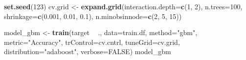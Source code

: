 \documentclass[]{article}
\newenvironment{Shaded}{\begin{snugshade}}{\end{snugshade}}
\newcommand{\DataTypeTok}[1]{\textcolor[rgb]{0.13,0.29,0.53}{#1}}
\newcommand{\DecValTok}[1]{\textcolor[rgb]{0.00,0.00,0.81}{#1}}
\newcommand{\FloatTok}[1]{\textcolor[rgb]{0.00,0.00,0.81}{#1}}
\newcommand{\KeywordTok}[1]{\textcolor[rgb]{0.13,0.29,0.53}{\textbf{#1}}}
\newcommand{\NormalTok}[1]{#1}
\newcommand{\OperatorTok}[1]{\textcolor[rgb]{0.81,0.36,0.00}{\textbf{#1}}}
\newcommand{\OtherTok}[1]{\textcolor[rgb]{0.56,0.35,0.01}{#1}}
\newcommand{\StringTok}[1]{\textcolor[rgb]{0.31,0.60,0.02}{#1}}
\begin{document}
\begin{Shaded}
\begin{Highlighting}[]
\KeywordTok{set.seed}\NormalTok{(}\DecValTok{123}\NormalTok{)}
\NormalTok{cv.grid <-}\StringTok{ }\KeywordTok{expand.grid}\NormalTok{(}\DataTypeTok{interaction.depth=}\KeywordTok{c}\NormalTok{(}\DecValTok{1}\NormalTok{, }\DecValTok{2}\NormalTok{),}
                       \DataTypeTok{n.trees=}\DecValTok{100}\NormalTok{,}
                       \DataTypeTok{shrinkage=}\KeywordTok{c}\NormalTok{(}\FloatTok{0.001}\NormalTok{, }\FloatTok{0.01}\NormalTok{, }\FloatTok{0.1}\NormalTok{),}
                       \DataTypeTok{n.minobsinnode=}\KeywordTok{c}\NormalTok{(}\DecValTok{2}\NormalTok{, }\DecValTok{5}\NormalTok{, }\DecValTok{15}\NormalTok{))}

\NormalTok{model_gbm <-}\StringTok{ }\KeywordTok{train}\NormalTok{(target }\OperatorTok{~}\StringTok{ }\NormalTok{., }\DataTypeTok{data=}\NormalTok{train.df,}
                  \DataTypeTok{method=}\StringTok{"gbm"}\NormalTok{,}
                  \DataTypeTok{metric=}\StringTok{"Accuracy"}\NormalTok{,}
                  \DataTypeTok{trControl=}\NormalTok{cv.cntrl,}
                  \DataTypeTok{tuneGrid=}\NormalTok{cv.grid,}
                  \DataTypeTok{distribution=}\StringTok{"adaboost"}\NormalTok{,}
                  \DataTypeTok{verbose=}\OtherTok{FALSE}\NormalTok{)}
\NormalTok{model_gbm}
\end{Highlighting}
\end{Shaded}

\newpage
\end{document}
